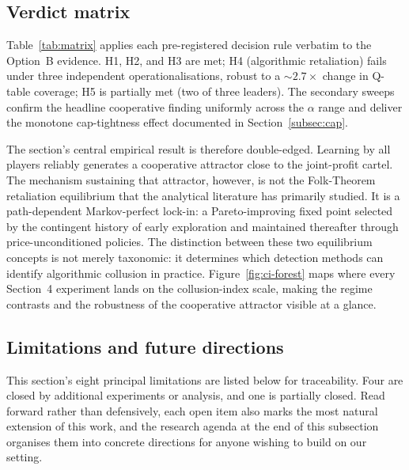 
\subsection{Verdict matrix}
\label{subsec:matrix}

Table~\ref{tab:matrix} applies each pre-registered decision rule
verbatim to the Option~B evidence. H1, H2, and H3 are met;
H4 (algorithmic retaliation) fails under three independent
operationalisations, robust to a ${\sim}2.7\times$ change in
Q-table coverage; H5 is partially met (two of three leaders).
The secondary sweeps confirm the headline cooperative finding
uniformly across the $\alpha$ range and deliver the monotone
cap-tightness effect documented in
Section~\ref{subsec:cap}.

The section's central empirical result is therefore
double-edged. Learning by all players reliably generates a
cooperative attractor close to the joint-profit cartel. The
mechanism sustaining that attractor, however, is not the
Folk-Theorem retaliation equilibrium that the analytical
literature has primarily studied. It is a path-dependent
Markov-perfect lock-in: a Pareto-improving fixed point selected
by the contingent history of early exploration and maintained
thereafter through price-unconditioned policies. The distinction
between these two equilibrium concepts is not merely taxonomic:
it determines which detection methods can identify algorithmic
collusion in practice. Figure~\ref{fig:ci-forest} maps where every
Section~4 experiment lands on the collusion-index scale, making the
regime contrasts and the robustness of the cooperative attractor
visible at a glance.


\subsection{Limitations and future directions}
\label{subsec:limitations}

This section's eight principal limitations are listed below for
traceability. Four are closed by additional experiments or analysis,
and one is partially closed. Read forward rather than defensively, each open
item also marks the most natural extension of this work, and the
research agenda at the end of this subsection organises them into
concrete directions for anyone wishing to build on our setting.

